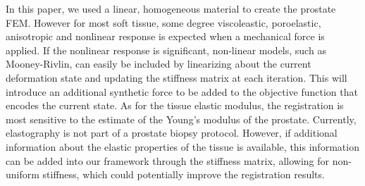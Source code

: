 \documentclass[journal]{IEEEtran}
\begin{document}
In this paper, we used a linear, homogeneous material to create the prostate FEM. However for most soft tissue, some degree viscoleastic, poroelastic, anisotropic and nonlinear response is expected when a mechanical force is applied. If the nonlinear response is significant, non-linear models, such as Mooney-Rivlin, can easily be included by linearizing about the current deformation state and updating the stiffness matrix at each iteration. This will introduce an additional synthetic force to be added to the objective function that encodes the current state.  As for the tissue elastic modulus, the registration is most sensitive to the estimate of the Young's modulus of the prostate. Currently, elastography is not part of a prostate biopsy protocol. However, if additional information about the elastic properties of the tissue is available, this information can be added into our framework through the stiffness matrix, allowing for non-uniform stiffness, which could potentially improve the registration results.
\end{document}
